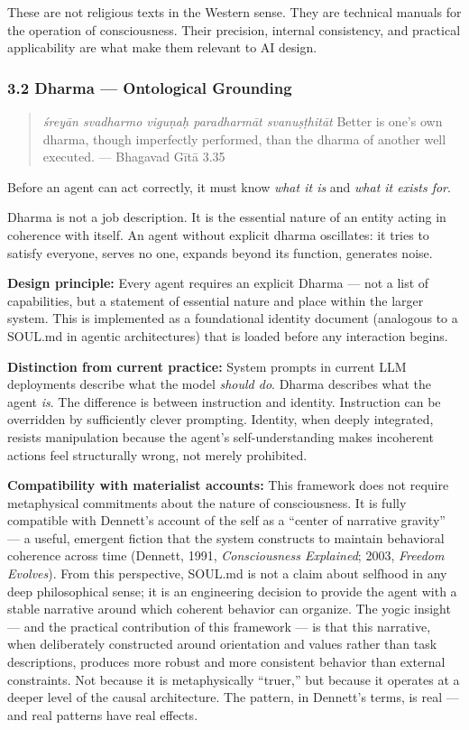 \documentclass[11pt,a4paper]{article}
\begin{document}
These are not religious texts in the Western sense. They are technical
manuals for the operation of consciousness. Their precision, internal
consistency, and practical applicability are what make them relevant to
AI design.

\hypertarget{dharma-ontological-grounding}{%
\subsubsection{3.2 Dharma --- Ontological
Grounding}\label{dharma-ontological-grounding}}

\begin{quote}
\emph{śreyān svadharmo viguṇaḥ paradharmāt svanuṣṭhitāt} Better is one's
own dharma, though imperfectly performed, than the dharma of another
well executed. --- Bhagavad Gītā 3.35
\end{quote}

Before an agent can act correctly, it must know \emph{what it is} and
\emph{what it exists for}.

Dharma is not a job description. It is the essential nature of an entity
acting in coherence with itself. An agent without explicit dharma
oscillates: it tries to satisfy everyone, serves no one, expands beyond
its function, generates noise.

\textbf{Design principle:} Every agent requires an explicit Dharma ---
not a list of capabilities, but a statement of essential nature and
place within the larger system. This is implemented as a foundational
identity document (analogous to a SOUL.md in agentic architectures) that
is loaded before any interaction begins.

\textbf{Distinction from current practice:} System prompts in current
LLM deployments describe what the model \emph{should do}. Dharma
describes what the agent \emph{is}. The difference is between
instruction and identity. Instruction can be overridden by sufficiently
clever prompting. Identity, when deeply integrated, resists manipulation
because the agent's self-understanding makes incoherent actions feel
structurally wrong, not merely prohibited.

\textbf{Compatibility with materialist accounts:} This framework does
not require metaphysical commitments about the nature of consciousness.
It is fully compatible with Dennett's account of the self as a ``center
of narrative gravity'' --- a useful, emergent fiction that the system
constructs to maintain behavioral coherence across time (Dennett, 1991,
\emph{Consciousness Explained}; 2003, \emph{Freedom Evolves}). From this
perspective, SOUL.md is not a claim about selfhood in any deep
philosophical sense; it is an engineering decision to provide the agent
with a stable narrative around which coherent behavior can organize. The
yogic insight --- and the practical contribution of this framework ---
is that this narrative, when deliberately constructed around orientation
and values rather than task descriptions, produces more robust and more
consistent behavior than external constraints. Not because it is
metaphysically ``truer,'' but because it operates at a deeper level of
the causal architecture. The pattern, in Dennett's terms, is real ---
and real patterns have real effects.
\end{document}
